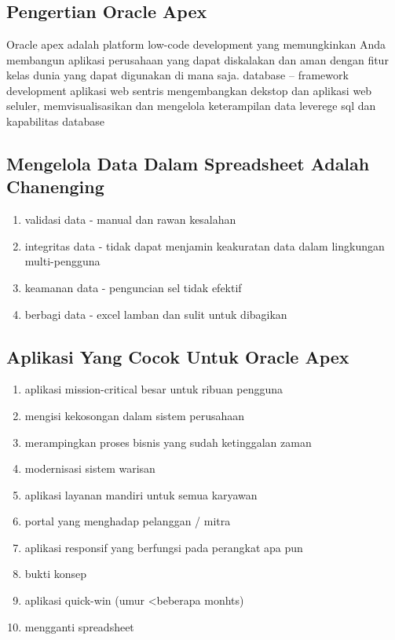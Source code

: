 \chapter{}

\section{Pengertian Oracle Apex}
Oracle apex adalah  platform low-code development yang memungkinkan Anda membangun aplikasi perusahaan yang dapat diskalakan dan aman dengan fitur kelas dunia yang dapat digunakan di mana saja. database – framework development aplikasi web sentris mengembangkan dekstop dan aplikasi web seluler, memvisualisasikan dan mengelola keterampilan data leverege sql dan kapabilitas database 


\section{Mengelola Data Dalam Spreadsheet Adalah Chanenging}
\begin{enumerate}
    \item validasi data - manual dan rawan kesalahan
    \item integritas data - tidak dapat menjamin keakuratan data dalam lingkungan multi-pengguna
    \item keamanan data - penguncian sel tidak efektif
    \item berbagi data - excel lamban dan sulit untuk dibagikan
\end{enumerate}


\section{Aplikasi Yang Cocok Untuk Oracle Apex}
\begin{enumerate}
\item aplikasi mission-critical besar untuk ribuan pengguna
\item mengisi kekosongan dalam sistem perusahaan
\item merampingkan proses bisnis yang sudah ketinggalan zaman
\item modernisasi sistem warisan
\item aplikasi layanan mandiri untuk semua karyawan
\item portal yang menghadap pelanggan / mitra
\item aplikasi responsif yang berfungsi pada perangkat apa pun
\item bukti konsep
\item aplikasi quick-win (umur <beberapa monhts)
\item mengganti spreadsheet
\end{enumerate}

